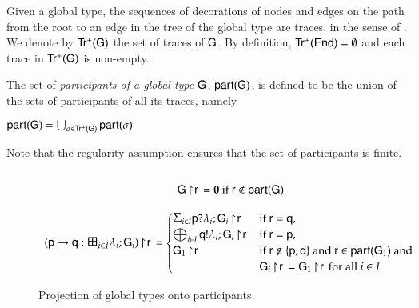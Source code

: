 Given a global type, the sequences of decorations of nodes and edges on
the path from the root to an edge in the tree of the global type are traces, in
the sense of .  We denote by ${\sf Tr^+}({\sf G})$ the set of
traces of ${\sf G}$. By definition, ${\sf Tr^+}(\mathsf{End}) = \emptyset$ and each
trace in ${\sf Tr^+}({\sf G})$ is non-empty.
\label{G-traces}



The set of {\em participants of a global type ${{\sf G}}$},
${\sf part}({{\sf G}})$, 
is defined to be the union of the sets of participants of all its traces, namely\\
\centerline{${\sf part}({{\sf G}}) = \bigcup_{\sigma \in
    {\sf Tr^+}({\sf G})} {\sf part}(\sigma) $}  Note that the
regularity assumption ensures that the set of participants is finite.



\begin{figure}[t]
\[
 \begin{array}{c}
 \\[-1pt]
\proj\G{\pr} = \inact \text{ if }\pr\not\in\participant\G \\\\
\proj{(\gt\pp\q i I \M \RG)}\pr=\begin{cases}
  \inpP\pp{i}{I}{\M}{\proj{\RG_i}\pr}    & \text{if }\pr=\q, \\
    \oupP\q{i}{I}{\M}{\proj{\RG_i}\pr}    & \text{if }\pr=\pp, \\
      \proj{\RG_1}\pr  & \text{if } \pr\not\in\set{\pp, \q}\text{ and } \pr\in\participant{\RG_1} \text{ and }\\
      &\proj{\RG_i}\pr=\proj{\RG_1}\pr\text{ for all } i \in I
\end{cases}\\[13pt]
\end{array}
\]
\caption{Projection of  global types onto participants.} 
\end{figure}
 
